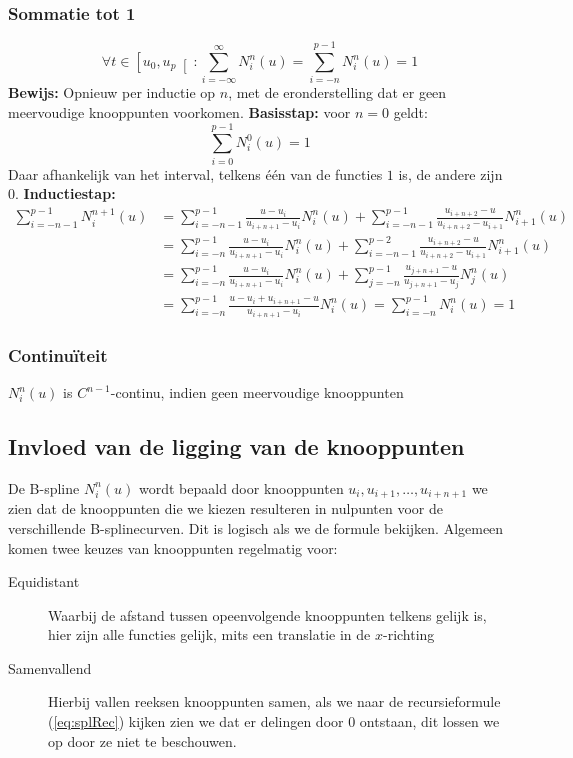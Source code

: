\documentclass[a4paper,titlepage]{article}
\newcommand{\brak}[1]{\left(#1\right)}
\newcommand{\rinva}[1]{\left[#1\right[}
\newcommand{\splineDef}{\ensuremath{N_i^n\brak{u}} }
\begin{document}
\subsubsection{Sommatie tot 1}
\begin{equation}
\forall t\in\rinva{u_0,u_p}:\displaystyle\sum_{i=-\infty}^{\infty}{N_i^n\brak{u}}=\sum_{i=-n}^{p-1}{N_i^n\brak{u}}=1
\end{equation}
\textbf{Bewijs: } Opnieuw per inductie op $n$, met de eronderstelling dat er geen meervoudige knooppunten voorkomen.
\textbf{Basisstap: } voor $n=0$ geldt:
\begin{equation}
\displaystyle\sum_{i=0}^{p-1}{N_i^0\brak{u}}=1
\end{equation}
Daar afhankelijk van het interval, telkens \'e\'en van de functies $1$ is, de andere zijn $0$.
\textbf{Inductiestap: }
\begin{equation}
\begin{array}{rl}
\displaystyle\sum_{i=-n-1}^{p-1}{N_i^{n+1}\brak{u}}&=\displaystyle\sum_{i=-n-1}^{p-1}{\displaystyle\frac{u-u_i}{u_{i+n+1}-u_i}N_i^n\brak{u}}+\displaystyle\sum_{i=-n-1}^{p-1}{\displaystyle\frac{u_{i+n+2}-u}{u_{i+n+2}-u_{i+1}}N_{i+1}^n\brak{u}}\\
&=\displaystyle\sum_{i=-n}^{p-1}{\displaystyle\frac{u-u_i}{u_{i+n+1}-u_i}N_i^n\brak{u}}+\displaystyle\sum_{i=-n-1}^{p-2}{\displaystyle\frac{u_{i+n+2}-u}{u_{i+n+2}-u_{i+1}}N_{i+1}^n\brak{u}}\\
&=\displaystyle\sum_{i=-n}^{p-1}{\displaystyle\frac{u-u_i}{u_{i+n+1}-u_i}N_i^n\brak{u}}+\displaystyle\sum_{j=-n}^{p-1}{\displaystyle\frac{u_{j+n+1}-u}{u_{j+n+1}-u_{j}}N_j^n\brak{u}}\\
&=\displaystyle\sum_{i=-n}^{p-1}{\displaystyle\frac{u-u_i+u_{i+n+1}-u}{u_{i+n+1}-u_i}N_i^n\brak{u}}=\displaystyle\sum_{i=-n}^{p-1}{N_i^n\brak{u}}=1
\end{array}
\end{equation}
\subsubsection{Continu\"iteit}
\splineDef is $C^{n-1}$-continu, indien geen meervoudige knooppunten
\subsection{Invloed van de ligging van de knooppunten}
\label{subsec:splineInfl}
De B-spline \splineDef wordt bepaald door knooppunten $u_i,u_{i+1},\ldots,u_{i+n+1}$ we zien dat de knooppunten die we kiezen resulteren in nulpunten voor de verschillende B-splinecurven. Dit is logisch als we de formule bekijken.
Algemeen komen twee keuzes van knooppunten regelmatig voor:
\begin{description}
 \item[Equidistant] Waarbij de afstand tussen opeenvolgende knooppunten telkens gelijk is, hier zijn alle functies gelijk, mits een translatie in de $x$-richting
 \item[Samenvallend] Hierbij vallen reeksen knooppunten samen, als we naar de recursieformule (\ref{eq:splRec}) kijken zien we dat er delingen door 0 ontstaan, dit lossen we op door ze niet te beschouwen.
 \end{description}
\end{document}
